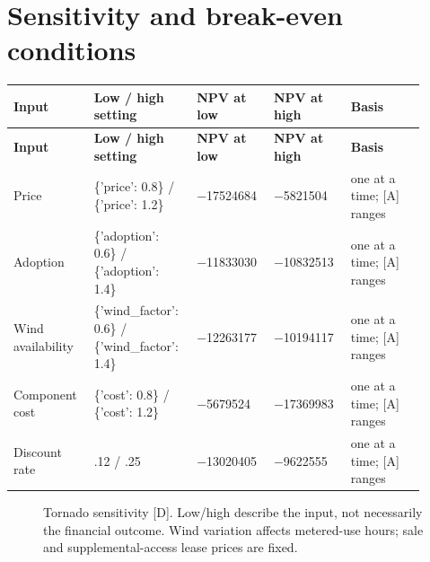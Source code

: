 \documentclass[11pt,a4paper]{article}
\begin{document}
\clearpage\section{Sensitivity and break-even conditions}
{\small
\setlength{\tabcolsep}{3pt}\renewcommand{\arraystretch}{1.18}
\begin{longtable}{@{}>{\raggedright\arraybackslash}p{0.1786\linewidth}>{\raggedright\arraybackslash}p{0.2211\linewidth}>{\raggedright\arraybackslash}p{0.1701\linewidth}>{\raggedright\arraybackslash}p{0.1701\linewidth}>{\raggedright\arraybackslash}p{0.1701\linewidth}@{}}
\toprule \textbf{Input} & \textbf{Low / high setting} & \textbf{NPV at low} & \textbf{NPV at high} & \textbf{Basis} \\ \midrule
\endfirsthead\toprule \textbf{Input} & \textbf{Low / high setting} & \textbf{NPV at low} & \textbf{NPV at high} & \textbf{Basis} \\ \midrule
\endhead\bottomrule\endfoot
Price & \{'price': 0.8\} / \{'price': 1.2\} & \num{-17524684} & \num{-5821504} & [D] one at a time; [A] ranges \\
Adoption & \{'adoption': 0.6\} / \{'adoption': 1.4\} & \num{-11833030} & \num{-10832513} & [D] one at a time; [A] ranges \\
Wind availability & \{'wind\_factor': 0.6\} / \{'wind\_factor': 1.4\} & \num{-12263177} & \num{-10194117} & [D] one at a time; [A] ranges \\
Component cost & \{'cost': 0.8\} / \{'cost': 1.2\} & \num{-5679524} & \num{-17369983} & [D] one at a time; [A] ranges \\
Discount rate & .12 / .25 & \num{-13020405} & \num{-9622555} & [D] one at a time; [A] ranges \\
\end{longtable}}
\begin{figure}[htbp]\centering{}\caption{Tornado sensitivity [D]. Low/high describe the input, not necessarily the financial outcome. Wind variation affects metered-use hours; sale and supplemental-access lease prices are fixed.}\end{figure}
\end{document}
